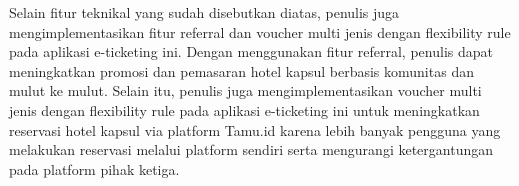 Selain fitur teknikal yang sudah disebutkan diatas, penulis juga mengimplementasikan fitur referral dan voucher multi jenis dengan flexibility rule pada aplikasi e-ticketing ini. Dengan menggunakan fitur referral, penulis dapat meningkatkan promosi dan pemasaran hotel kapsul berbasis komunitas dan mulut ke mulut. Selain itu, penulis juga mengimplementasikan voucher multi jenis dengan flexibility rule pada aplikasi e-ticketing ini untuk meningkatkan reservasi hotel kapsul via platform Tamu.id  karena lebih banyak pengguna yang melakukan reservasi melalui platform sendiri serta mengurangi ketergantungan pada platform pihak ketiga.